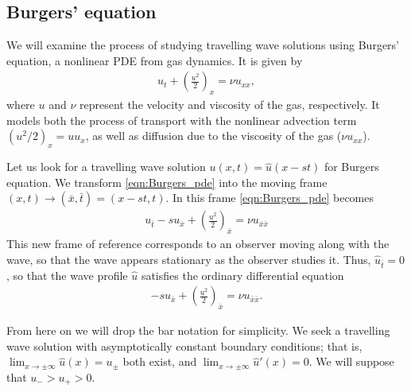 \subsection*{Burgers' equation}
We will examine the process of studying travelling wave solutions using Burgers' equation, a nonlinear PDE from gas dynamics.
It is given by
\begin{align}
	u_t + \left( \frac{u^2}{2} \right)_x = \nu u_{xx}, \label{eqn:Burgers_pde}
\end{align}
where $u$ and $\nu$ represent the velocity and viscosity of the gas, respectively.
It models both the process of transport with the nonlinear advection term $(u^2/2)_x = u u_x$, as well as diffusion due to the viscosity of the gas ($\nu u_{xx}$).

Let us look for a travelling wave solution $u(x,t) = \hat{u}(x-st)$ for Burgers equation.
We transform \eqref{eqn:Burgers_pde} into the moving frame $(x,t) \to (\bar{x},\bar{t}) = (x-st, t)$. In this frame \eqref{eqn:Burgers_pde} becomes
\begin{align}
	u_{\bar{t}} - s u_{\bar{x}}+ \left(\frac{u^2}{2} \right)_{\bar{x}} = \nu u_{\bar{x}\bar{x}}
	\label{eqn:Burgers_pde_moving_frame}
\end{align}
This new frame of reference corresponds to an observer moving along with the wave, so that the wave appears stationary as the observer studies it.
Thus, $\hat{u}_{\bar{t}} = 0$, so that the wave profile $\hat{u}$ satisfies the ordinary differential equation
\begin{align}
	 -s u_{\bar{x}}+ \left(\frac{u^2}{2} \right)_{\bar{x}} = \nu u_{\bar{x}\bar{x}}.
	\label{eqn:Burgers_ode}
\end{align}

From here on we will drop the bar notation for simplicity.
We seek a travelling wave solution with asymptotically constant boundary conditions; that is,  $\lim_{x \to \pm \infty}\hat{u}(x) = u_{\pm}$
both exist, and  $\lim_{x \to \pm \infty} \hat{u}'(x) = 0$.
We will suppose that $u_- > u_+ > 0$.


